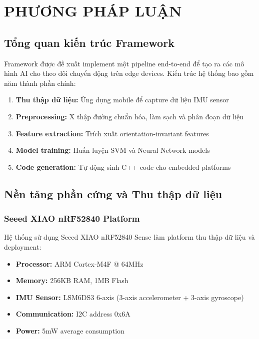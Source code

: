 \chapter{PHƯƠNG PHÁP LUẬN}
\label{chap:methodology}

\section{Tổng quan kiến trúc Framework}
\label{sec:architecture-overview}

Framework được đề xuất implement một pipeline end-to-end để tạo ra các mô hình AI cho theo dõi chuyển động trên edge devices. Kiến trúc hệ thống bao gồm năm thành phần chính:

\begin{enumerate}
    \item \textbf{Thu thập dữ liệu:} Ứng dụng mobile để capture dữ liệu IMU sensor
    \item \textbf{Preprocessing:} X thập đường chuẩn hóa, làm sạch và phân đoạn dữ liệu
    \item \textbf{Feature extraction:} Trích xuất orientation-invariant features
    \item \textbf{Model training:} Huấn luyện SVM và Neural Network models
    \item \textbf{Code generation:} Tự động sinh C++ code cho embedded platforms
\end{enumerate}

\section{Nền tảng phần cứng và Thu thập dữ liệu}
\label{sec:hardware-data-collection}

\subsection{Seeed XIAO nRF52840 Platform}
Hệ thống sử dụng Seeed XIAO nRF52840 Sense làm platform thu thập dữ liệu và deployment:
\begin{itemize}
    \item \textbf{Processor:} ARM Cortex-M4F @ 64MHz
    \item \textbf{Memory:} 256KB RAM, 1MB Flash
    \item \textbf{IMU Sensor:} LSM6DS3 6-axis (3-axis accelerometer + 3-axis gyroscope)
    \item \textbf{Communication:} I2C address 0x6A
    \item \textbf{Power:} 5mW average consumption
\end{itemize}


